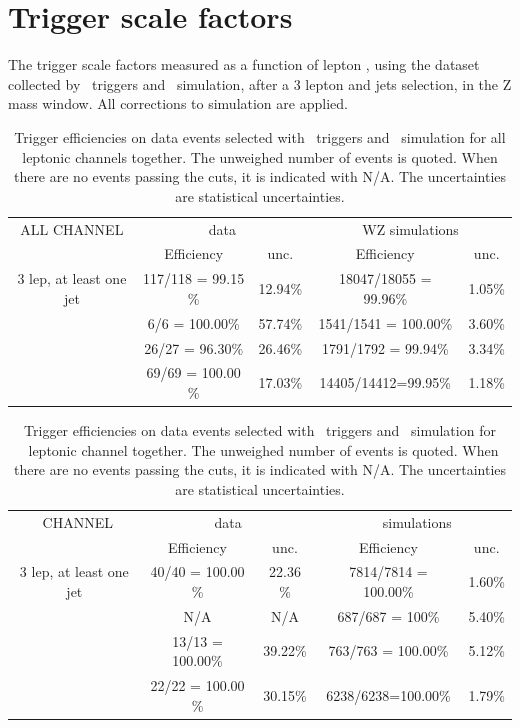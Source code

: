 

\chapter{Trigger scale factors}
\label{app:TriggerSF}



The trigger scale factors measured as a function of lepton \pt, using the dataset collected by \Etmis\ triggers and \WZ\ simulation, after a 3 lepton and jets selection, in the Z mass window. All corrections to simulation are applied.



\begin{table}[htbp]
	\centering
	\caption{Trigger efficiencies on data events selected with \Etmis\ triggers and \WZ\ simulation for all leptonic channels together. The unweighed number of events is quoted. When there are no events passing the cuts, it is indicated with N/A. The uncertainties are statistical uncertainties.}
	\begin{tabular}{c|c|c|c|c}
		\toprule
		ALL CHANNEL & \multicolumn{2}{c|}{data} & \multicolumn{2}{c}{WZ simulations} \\ 
		& Efficiency & unc. & Efficiency & unc. \\
		\midrule 
		3 lep,  at least one jet & 117/118 = 99.15 \% & 12.94\% & 18047/18055 = 99.96\%  & 1.05\% \\ 
		\hline 
		\STSR & 6/6 = 100.00\% & 57.74\% & 1541/1541 = 100.00\% & 3.60\% \\ 
		\hline 
		\TTSR & 26/27 = 96.30\% & 26.46\% & 1791/1792 = 99.94\% & 3.34\% \\ 
		\hline 
		\WZCR & 69/69 = 100.00 \% & 17.03\% & 14405/14412=99.95\% & 1.18\% \\ 
		\bottomrule 
	\end{tabular} 
\end{table}	
\begin{table}[htbp]
	\centering
	\caption{Trigger efficiencies on data events selected with \Etmis\ triggers and \WZ\ simulation for \mumumu\ leptonic channel together. The unweighed number of events is quoted. When there are no events passing the cuts, it is indicated with N/A. The uncertainties are statistical uncertainties.}
	\begin{tabular}{c|c|c|c|c}
		\toprule 
		\mumumu\ CHANNEL & \multicolumn{2}{c|}{data} & \multicolumn{2}{c}{\WZ\ simulations} \\
		& Efficiency & unc. & Efficiency & unc. \\ 
		\midrule 
		3 lep,  at least one jet & 40/40 = 100.00 \% & 22.36 \% & 7814/7814 = 100.00\%  & 1.60\% \\ 
		\hline 
		\STSR & N/A & N/A & 687/687 = 100\% & 5.40\% \\ 
		\hline 
		\TTSR & 13/13 = 100.00\% & 39.22\% &763/763 = 100.00\% & 5.12\% \\ 
		\hline 
		\WZCR & 22/22 = 100.00 \% & 30.15\% & 6238/6238=100.00\% & 1.79\% \\ 
		\bottomrule
	\end{tabular} 
\end{table}	
